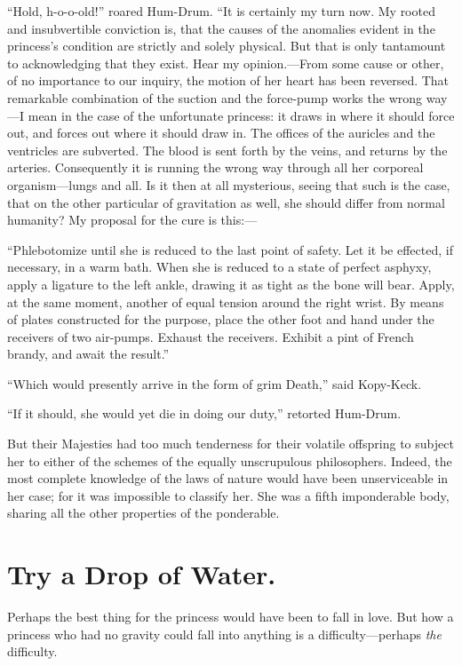 \documentclass[12pt]{memoir}
\begin{document}
``Hold, h-o-o-old!'' roared Hum-Drum.  ``It is certainly my turn now.
My rooted and insubvertible conviction is, that the causes of the
anomalies evident in the princess's condition are strictly and solely
physical.  But that is only tantamount to acknowledging that they
exist.  Hear my opinion.---From some cause or other, of no importance
to our inquiry, the motion of her heart has been reversed.  That
remarkable combination of the suction and the force-pump works the
wrong way---I mean in the case of the unfortunate princess: it draws
in where it should force out, and forces out where it should draw in.
The offices of the auricles and the ventricles are subverted.  The
blood is sent forth by the veins, and returns by the arteries.
Consequently it is running the wrong way through all her corporeal
organism---lungs and all.  Is it then at all mysterious, seeing that
such is the case, that on the other particular of gravitation as well,
she should differ from normal humanity?  My proposal for the cure is
this:---

``Phlebotomize until she is reduced to the last point of safety.  Let
it be effected, if necessary, in a warm bath.  When she is reduced to
a state of perfect asphyxy, apply a ligature to the left ankle,
drawing it as tight as the bone will bear.  Apply, at the same moment,
another of equal tension around the right wrist.  By means of plates
constructed for the purpose, place the other foot and hand under the
receivers of two air-pumps.  Exhaust the receivers.  Exhibit a pint of
French brandy, and await the result.''

``Which would presently arrive in the form of grim Death,'' said
Kopy-Keck.

``If it should, she would yet die in doing our duty,'' retorted
Hum-Drum.

But their Majesties had too much tenderness for their volatile
offspring to subject her to either of the schemes of the equally
unscrupulous philosophers.  Indeed, the most complete knowledge of the
laws of nature would have been unserviceable in her case; for it was
impossible to classify her.  She was a fifth imponderable body,
sharing all the other properties of the ponderable.


\chapter{Try a Drop of Water.}


Perhaps the best thing for the princess would have been to fall in
love.  But how a princess who had no gravity could fall into anything
is a difficulty---perhaps \emph{the} difficulty.
\end{document}
